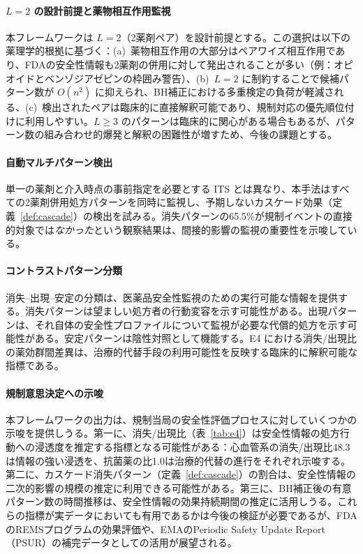 \documentclass[11pt]{article}
\begin{document}
\paragraph{$L = 2$ の設計前提と薬物相互作用監視}
本フレームワークは $L = 2$（2薬剤ペア）を設計前提とする。この選択は以下の薬理学的根拠に基づく：(a)~薬物相互作用の大部分はペアワイズ相互作用であり、FDAの安全性情報も2薬剤の併用に対して発出されることが多い（例：オピオイドとベンゾジアゼピンの枠囲み警告）、(b)~$L = 2$ に制約することで候補パターン数が $O(n^2)$ に抑えられ、BH補正における多重検定の負荷が軽減される、(c)~検出されたペアは臨床的に直接解釈可能であり、規制対応の優先順位付けに利用しやすい。$L \geq 3$ のパターンは臨床的に関心がある場合もあるが、パターン数の組み合わせ的爆発と解釈の困難性が増すため、今後の課題とする。

\paragraph{自動マルチパターン検出}
単一の薬剤と介入時点の事前指定を必要とする ITS とは異なり、本手法はすべての2薬剤併用処方パターンを同時に監視し、予期しないカスケード効果（定義~\ref{def:cascade}）の検出を試みる。消失パターンの65.5\%が規制イベントの直接的対象では\emph{なかった}という観察結果は、間接的影響の監視の重要性を示唆している。

\paragraph{コントラストパターン分類}
消失--出現--安定の分類は、医薬品安全性監視のための実行可能な情報を提供する。消失パターンは望ましい処方者の行動変容を示す可能性がある。出現パターンは、それ自体の安全性プロファイルについて監視が必要な代償的処方を示す可能性がある。安定パターンは陰性対照として機能する。E4 における消失/出現比の薬効群間差異は、治療的代替手段の利用可能性を反映する臨床的に解釈可能な指標である。

\paragraph{規制意思決定への示唆}
本フレームワークの出力は、規制当局の安全性評価プロセスに対していくつかの示唆を提供しうる。第一に、消失/出現比（表~\ref{tab:e4}）は安全性情報の処方行動への浸透度を推定する指標となる可能性がある：心血管系の消失/出現比48.3は情報の強い浸透を、抗菌薬の比1.0は治療的代替の進行をそれぞれ示唆する。第二に、カスケード消失パターン（定義~\ref{def:cascade}）の割合は、安全性情報の二次的影響の規模の推定に利用できる可能性がある。第三に、BH補正後の有意パターン数の時間推移は、安全性情報の効果持続期間の推定に活用しうる。これらの指標が実データにおいても有用であるかは今後の検証が必要であるが、FDAのREMSプログラムの効果評価や、EMAのPeriodic Safety Update Report（PSUR）の補完データとしての活用が展望される。
\end{document}
